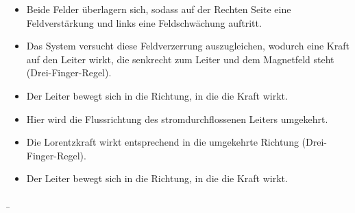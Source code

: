 \begin{frame}
{\begin{minipage}{0.74\textwidth}
\begin{itemize}
				\item Beide Felder überlagern sich, sodass auf der Rechten Seite eine Feldverstärkung und links eine Feldschwächung auftritt.
				\item Das System versucht diese Feldverzerrung auszugleichen, wodurch eine Kraft auf den Leiter wirkt, die senkrecht zum Leiter und dem Magnetfeld steht (Drei-Finger-Regel).
				\item Der Leiter bewegt sich in die Richtung, in die die Kraft wirkt.
			\end{itemize}
		\end{minipage}
		\begin{minipage}{0.25\textwidth}
		\end{minipage}
		\begin{minipage}{0.74\textwidth}
			\begin{itemize}
				\item Hier wird die Flussrichtung des stromdurchflossenen Leiters umgekehrt.
				\item Die Lorentzkraft wirkt entsprechend in die umgekehrte Richtung (Drei-Finger-Regel).
				\item  Der Leiter bewegt sich in die Richtung, in die die Kraft wirkt.
			\end{itemize}
		\end{minipage}
	}
	\b{ %
		\begin{columns}
			\pause
			\pause
			\pause
		\end{columns}
	}
\end{frame}

